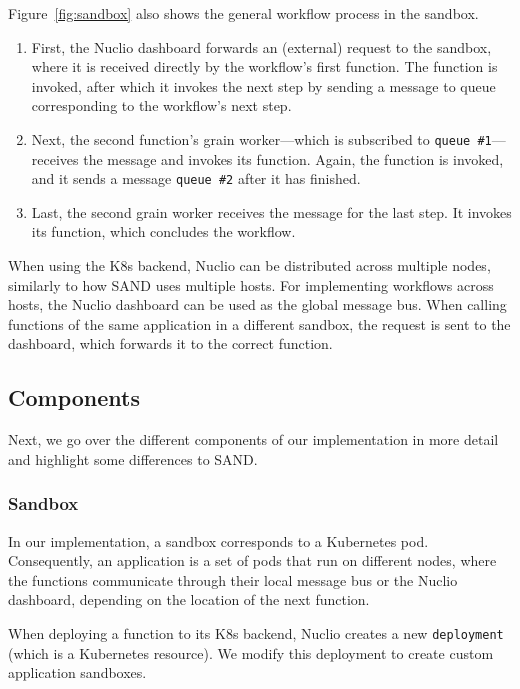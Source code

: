 Figure~\ref{fig:sandbox} also shows the general workflow process in the sandbox. 
\begin{enumerate}
    \item First, the Nuclio dashboard forwards an (external) request to the sandbox, where it is received directly by the workflow's first function. 
        The function is invoked, after which it invokes the next step by sending a message to queue corresponding to the workflow's next step.
    \item Next, the second function's grain worker—which is subscribed to \texttt{queue \#1}—receives the message and invokes its function.
        Again, the function is invoked, and it sends a message \texttt{queue \#2} after it has finished.
    \item Last, the second grain worker receives the message for the last step.
        It invokes its function, which concludes the workflow.
\end{enumerate}

When using the K8s backend, Nuclio can be distributed across multiple nodes, similarly to how SAND uses multiple hosts.
For implementing workflows across hosts, the Nuclio dashboard can be used as the global message bus. 
When calling functions of the same application in a different sandbox, the request is sent to the dashboard, which forwards it to the correct function.

\subsection{Components}

Next, we go over the different components of our implementation in more detail and highlight some differences to SAND.

\subsubsection{Sandbox}\label{subsub:sandbox}

In our implementation, a sandbox corresponds to a Kubernetes pod. 
Consequently, an application is a set of pods that run on different nodes, where the functions communicate through their local message bus or the Nuclio dashboard, depending on the location of the next function.

When deploying a function to its K8s backend, Nuclio creates a new \texttt{deployment} (which is a Kubernetes resource).
We modify this deployment to create custom application sandboxes.

